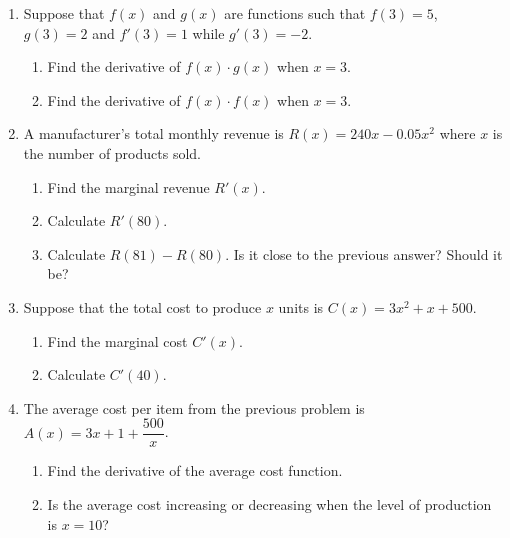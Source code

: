 \documentclass[10pt]{article}
\begin{document}
\begin{enumerate}
\setcounter{enumi}{\theenumCount}
\item Suppose that $f(x)$ and $g(x)$ are functions such that $f(3) = 5$, $g(3) = 2$ and $f'(3) = 1$ while $g'(3) = -2$. 
\begin{enumerate}
\item Find the derivative of $f(x) \cdot g(x)$ when $x = 3$. 
\vfill
\item Find the derivative of $f(x) \cdot f(x)$ when $x = 3$. 
\vfill
\end{enumerate}

\newpage
\item A manufacturer's total monthly revenue is $R(x) = 240 x - 0.05 x^2$ where $x$ is the number of products sold. 
\begin{enumerate}
\item Find the marginal revenue $R'(x)$. 
\vfill
\item Calculate $R'(80)$.  
\vfill

\item Calculate $R(81) - R(80)$.  Is it close to the previous answer?  Should it be? 
\vfill

\end{enumerate}


\item Suppose that the total cost to produce $x$ units is $C(x) = 3x^2 + x + 500$.  
\begin{enumerate}
\item Find the marginal cost $C'(x)$. 
\vfill

\item Calculate $C'(40)$.  
\vfill
\end{enumerate}

\item The average cost per item from the previous problem is $A(x) = 3x + 1 + \dfrac{500}{x}$.  
\begin{enumerate}
\item Find the derivative of the average cost function. 
\vfill

\item Is the average cost increasing or decreasing when the level of production is $x=10$?  
\vfill
\end{enumerate}

\end{enumerate}


\vfill

\end{document}
